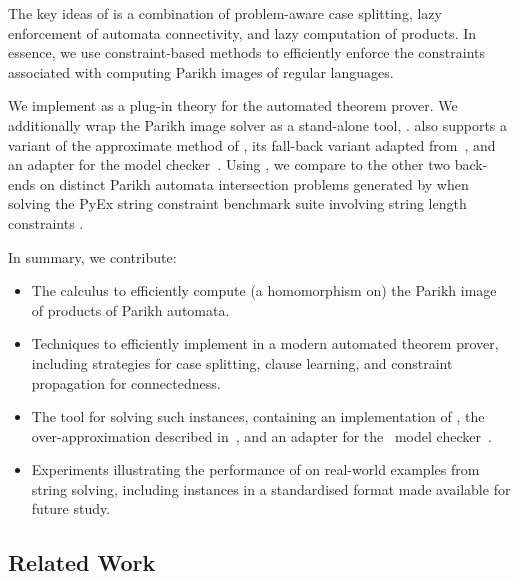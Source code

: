The key ideas of \Calculus{} is a combination of problem-aware case splitting,
lazy enforcement of automata connectivity, and lazy computation of products. In
essence, we use constraint-based methods to efficiently enforce the constraints
associated with computing Parikh images of regular languages.

We implement \Calculus{} as a plug-in theory for the \Princess{} automated
theorem prover.
%
We additionally wrap the Parikh image solver as a stand-alone tool, \Catra.
\Catra{} also supports a variant of the approximate method of
\cite{approximate-parikh}, its fall-back variant adapted
from~\cite{generate-parikh-image}, and an adapter for the \Nuxmv{} model
checker~\cite{nuxmv}. Using \Catra, we compare \Calculus{} to the other two
back-ends on \NrBenchmarks{} distinct Parikh automata intersection problems
generated by \OstrichPlus{} when solving the PyEx string constraint benchmark
suite involving string length constraints \cite{pyex}.



In summary, we contribute:
\begin{itemize}
    \item The \Calculus{} calculus to efficiently compute (a homomorphism on)
          the Parikh image of products of Parikh automata.
    \item Techniques to efficiently implement \Calculus{} in a modern
    automated theorem prover, including strategies for case splitting, clause
    learning, and constraint propagation for connectedness.
    \item The \Catra{} tool for solving such instances, containing an
    implementation of \Calculus{}, the over-approximation described
    in~\cite{approximate-parikh}, and an adapter for the~\Nuxmv{} model
    checker~\cite{nuxmv}.
    \item Experiments illustrating the performance of \Calculus{} on real-world
    examples from string solving, including \NrBenchmarks{} instances in a
    standardised format made available for future study.
\end{itemize}

\subsection{Related Work}

